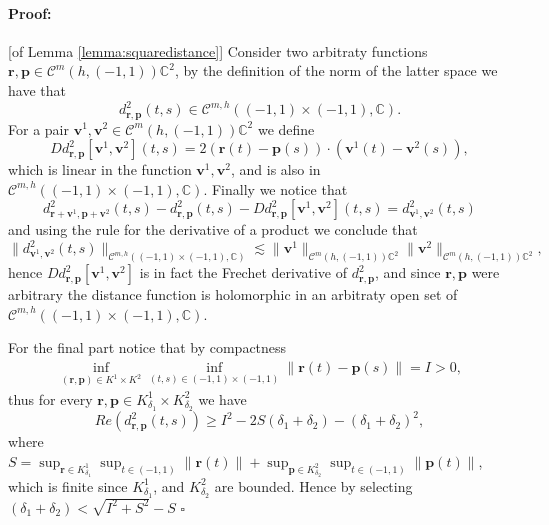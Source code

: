 \documentclass{article}
\newenvironment{proof}{\paragraph{Proof:}}{\hfill$\square$}
\newcommand{\IC}{{\mathbb C}}
\newcommand{\bp}{{\bm p}}
\newcommand{\cmspace}[3]{\mathcal{C}^{#1} \left( #2, #3 \right)}
\newcommand{\cmspaceh}[4]{\mathcal{C}^{#1,#2} \left( #3, #4 \right)}
\newcommand{\bv}{\bm{v}}
\newcommand{\br}{\bm{r}}
\newcommand{\iinterv}{(-1,1)\times(-1,1)}
\begin{document}
\begin{proof}[of Lemma \ref{lemma:squaredistance}]
Consider two arbitraty functions $\br,\bp \in \cmspace{m}{h}{(-1,1)}{\IC^2}$,  by the definition of the norm of the latter space we have that $$d_{\br,\bp}^2(t,s) \in \cmspaceh{m}{h}{\iinterv}{\IC}.$$
For a pair $\bv^1,\bv^2 \in \cmspace{m}{h}{(-1,1)}{\IC^2}$ we define
$$Dd_{\br,\bp}^2[\bv^1,\bv^2](t,s) = 2(\br(t)-\bp(s))\cdot (\bv^1(t)-\bv^2(s)),$$
which is linear in the function $\bv^1,\bv^2$, and is also in $\cmspaceh{m}{h}{\iinterv}{\IC}$. Finally we notice that 
$$
d^2_{\br+\bv^1,\bp+\bv^2}(t,s) -d^2_{\br,\bp}(t,s) -Dd_{\br,\bp}^2[\bv^1,\bv^2](t,s) = d^2_{\bv^1,\bv^2}(t,s)
$$
and using the rule for the derivative of a product we conclude that 
$$\| d^2_{\bv^1,\bv^2}(t,s)\|_{\cmspaceh{m}{h}{\iinterv}{\IC}} \lesssim \|\bv^1\|_{\cmspace{m}{h}{(-1,1)}{\IC^2}} \|\bv^2\|_{\cmspace{m}{h}{(-1,1)}{\IC^2}},$$
hence $Dd_{\br,\bp}^2[\bv^1,\bv^2]$ is in fact the Frechet derivative of $d_{\br,\bp}^2$, and since $\br,\bp$ were arbitrary the distance function is holomorphic in an arbitraty open set of 
$\cmspaceh{m}{h}{\iinterv}{\IC}$.

For the final part notice that by compactness 
\begin{align*}
\inf_{(\br,\bp) \in K^1 \times K^2} \inf_{(t,s) \in (-1,1)\times(-1,1)}
 \| \br(t) - \bp(s) \| = I > 0,
\end{align*}
thus for every $\br,\bp  \in K^1_{\delta_1} \times K^2_{\delta_2}$ we have
$$
Re(d_{\br,\bp}^2(t,s)) \geq I^2 -2 S(\delta_1 + \delta_2) - ( \delta_1 + \delta_2)^2,$$
where $S = \sup_{\br \in K^1_{\delta_1}} \sup_{t \in (-1,1)} \| \br(t)\| +
\sup_{\bp \in K^2_{\delta_2}} \sup_{t \in (-1,1)} \| \bp(t)\|$, which is finite since $K^1_{\delta_1}$, and $K^2_{\delta_2}$ are bounded. Hence by selecting $(\delta_1+\delta_2) < \sqrt{I^2+S^2}-S$
\end{proof}
\end{document}
